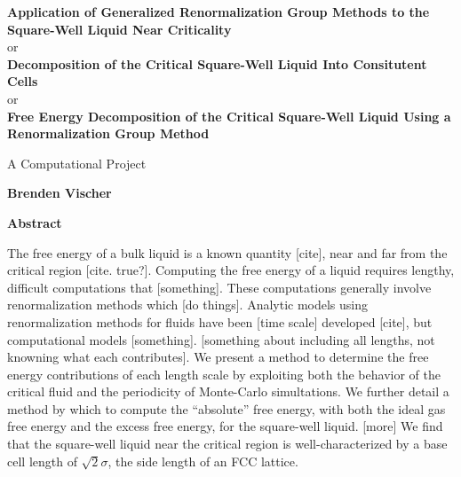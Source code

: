 \thispagestyle{plain}
\begin{center}
    \Large
    \textbf{Application of Generalized Renormalization Group Methods to the Square-Well Liquid Near Criticality}
    \\or\\
    \textbf{Decomposition of the Critical Square-Well Liquid Into Consitutent Cells}    \\or\\
    \textbf{Free Energy Decomposition of the Critical Square-Well Liquid Using a Renormalization Group Method}
   
    \vspace{0.8cm}
    \large
    A Computational Project
    
    \vspace{0.8cm}
    \textbf{Brenden Vischer}
    
    \vspace{1.2cm}
    \textbf{Abstract}
\end{center}

The free energy of a bulk liquid is a known quantity [cite], near and far from the critical region [cite. true?]. Computing the free energy of a liquid requires lengthy, difficult computations that [something]. These computations generally involve renormalization methods which [do things]. Analytic models using renormalization methods for fluids have been [time scale] developed [cite], but computational models [something]. [something about including all lengths, not knowning what each contributes]. We present a method to determine the free energy contributions of each length scale by exploiting both the behavior of the critical fluid and the periodicity of Monte-Carlo simultations. We further detail a method by which to compute the ``absolute'' free energy, with both the ideal gas free energy and the excess free energy, for the square-well liquid. [more] We find that the square-well liquid near the critical region is well-characterized by a base cell length of $\sqrt2\sigma$, the side length of an FCC lattice.  
\clearpage